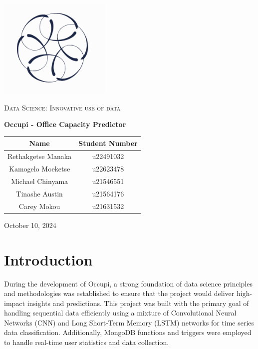 \documentclass[11pt,a4paper]{article}
\begin{document}
\begin{titlepage}
    \centering
    \includegraphics[width=0.4\textwidth]{logo-white.png}\par\vspace{1cm}
    {\scshape\LARGE Data Science: Innovative use of data \par}
    \vspace{1.5cm}
    {\huge\bfseries Occupi - Office Capacity Predictor\par}
    \vspace{2.5cm}
    \begin{tabular}{|c|c|}
        \hline
        \textbf{Name}      & \textbf{Student Number} \\
        \hline
        Rethakgetse Manaka & u22491032               \\
        Kamogelo Moeketse  & u22623478               \\
        Michael Chinyama   & u21546551               \\
        Tinashe Austin     & u21564176               \\
        Carey Mokou        & u21631532               \\
        \hline
    \end{tabular}
    \vfill
    {\large October 10, 2024\par}
\end{titlepage}

\tableofcontents
\pagebreak


\section*{Introduction}
During the development of Occupi, a strong foundation of data science principles and methodologies was established to ensure that the project would deliver high-impact insights 
and predictions. This project was built with the primary goal of handling sequential data efficiently using a mixture of Convolutional Neural Networks (CNN) 
and Long Short-Term Memory (LSTM) networks for time series data classification. 
Additionally, MongoDB functions and triggers were employed to handle real-time user statistics and data collection.
\end{document}
